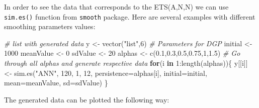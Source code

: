 \documentclass[
]{book}
\newenvironment{Shaded}{\begin{snugshade}}{\end{snugshade}}
\newcommand{\AttributeTok}[1]{\textcolor[rgb]{0.77,0.63,0.00}{#1}}
\newcommand{\CommentTok}[1]{\textcolor[rgb]{0.56,0.35,0.01}{\textit{#1}}}
\newcommand{\ControlFlowTok}[1]{\textcolor[rgb]{0.13,0.29,0.53}{\textbf{#1}}}
\newcommand{\DecValTok}[1]{\textcolor[rgb]{0.00,0.00,0.81}{#1}}
\newcommand{\FloatTok}[1]{\textcolor[rgb]{0.00,0.00,0.81}{#1}}
\newcommand{\FunctionTok}[1]{\textcolor[rgb]{0.00,0.00,0.00}{#1}}
\newcommand{\NormalTok}[1]{#1}
\newcommand{\OtherTok}[1]{\textcolor[rgb]{0.56,0.35,0.01}{#1}}
\newcommand{\SpecialCharTok}[1]{\textcolor[rgb]{0.00,0.00,0.00}{#1}}
\newcommand{\StringTok}[1]{\textcolor[rgb]{0.31,0.60,0.02}{#1}}
\theoremstyle{definition}
\theoremstyle{definition}
\theoremstyle{definition}
\theoremstyle{definition}
\theoremstyle{remark}
\begin{document}
In order to see the data that corresponds to the ETS(A,N,N) we can use \texttt{sim.es()} function from \texttt{smooth} package. Here are several examples with different smoothing parameters values:

\begin{Shaded}
\begin{Highlighting}[]
\CommentTok{\# list with generated data}
\NormalTok{y }\OtherTok{\textless{}{-}} \FunctionTok{vector}\NormalTok{(}\StringTok{"list"}\NormalTok{,}\DecValTok{6}\NormalTok{)}
\CommentTok{\# Parameters for DGP}
\NormalTok{initial }\OtherTok{\textless{}{-}} \DecValTok{1000}
\NormalTok{meanValue }\OtherTok{\textless{}{-}} \DecValTok{0}
\NormalTok{sdValue }\OtherTok{\textless{}{-}} \DecValTok{20}
\NormalTok{alphas }\OtherTok{\textless{}{-}} \FunctionTok{c}\NormalTok{(}\FloatTok{0.1}\NormalTok{,}\FloatTok{0.3}\NormalTok{,}\FloatTok{0.5}\NormalTok{,}\FloatTok{0.75}\NormalTok{,}\DecValTok{1}\NormalTok{,}\FloatTok{1.5}\NormalTok{)}
\CommentTok{\# Go through all alphas and generate respective data}
\ControlFlowTok{for}\NormalTok{(i }\ControlFlowTok{in} \DecValTok{1}\SpecialCharTok{:}\FunctionTok{length}\NormalTok{(alphas))\{}
\NormalTok{  y[[i]] }\OtherTok{\textless{}{-}} \FunctionTok{sim.es}\NormalTok{(}\StringTok{"ANN"}\NormalTok{, }\DecValTok{120}\NormalTok{, }\DecValTok{1}\NormalTok{, }\DecValTok{12}\NormalTok{, }\AttributeTok{persistence=}\NormalTok{alphas[i],}
                   \AttributeTok{initial=}\NormalTok{initial, }\AttributeTok{mean=}\NormalTok{meanValue, }\AttributeTok{sd=}\NormalTok{sdValue)}
\NormalTok{\}}
\end{Highlighting}
\end{Shaded}

The generated data can be plotted the following way:

\begin{Shaded}
\end{Shaded}
\end{document}
